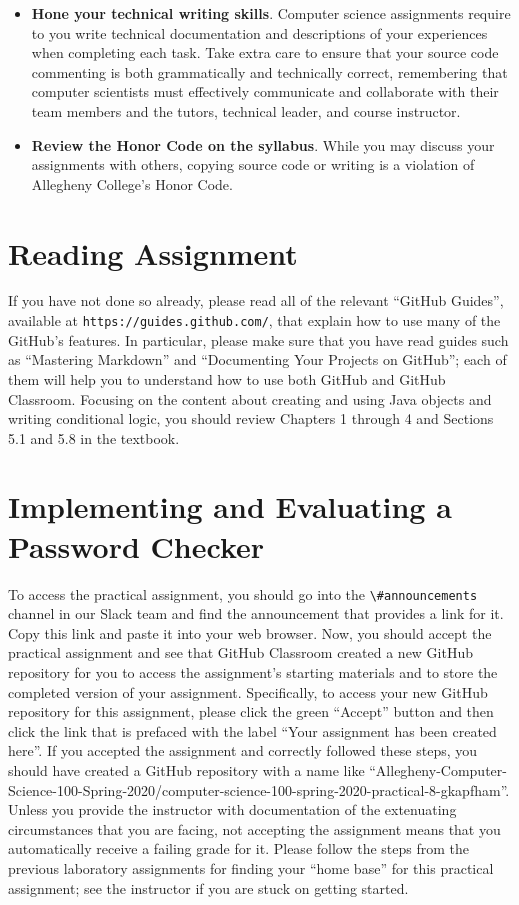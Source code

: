 \documentclass[11pt]{article}
\newcommand{\url}[1]{\lstinline{#1}}
\newcommand{\channel}[1]{\lstinline{#1}}
\begin{document}
\begin{itemize}
\item {\bf Hone your technical writing skills}. Computer science assignments
  require to you write technical documentation and descriptions of your
  experiences when completing each task. Take extra care to ensure that your
  source code commenting is both grammatically and technically correct,
  remembering that computer scientists must effectively communicate and
  collaborate with their team members and the tutors, technical leader, and
  course instructor.

\item {\bf Review the Honor Code on the syllabus}. While you may discuss your
  assignments with others, copying source code or writing is a violation of
  Allegheny College's Honor Code.

\end{itemize}

\section*{Reading Assignment}

If you have not done so already, please read all of the relevant ``GitHub
Guides'', available at \url{https://guides.github.com/}, that explain how to use
many of the GitHub's features. In particular, please make sure that you have
read guides such as ``Mastering Markdown'' and ``Documenting Your Projects on
GitHub''; each of them will help you to understand how to use both GitHub and
GitHub Classroom. Focusing on the content about creating and using Java objects
and writing conditional logic, you should review Chapters 1 through 4 and
Sections 5.1 and 5.8 in the textbook.

\section*{Implementing and Evaluating a Password Checker}

To access the practical assignment, you should go into the
\channel{\#announcements} channel in our Slack team and find the announcement
that provides a link for it. Copy this link and paste it into your web browser.
Now, you should accept the practical assignment and see that GitHub Classroom
created a new GitHub repository for you to access the assignment's starting
materials and to store the completed version of your assignment. Specifically,
to access your new GitHub repository for this assignment, please click the green
``Accept'' button and then click the link that is prefaced with the label ``Your
assignment has been created here''. If you accepted the assignment and correctly
followed these steps, you should have created a GitHub repository with a name
like
``Allegheny-Computer-Science-100-Spring-2020/computer-science-100-spring-2020-practical-8-gkapfham''.
Unless you provide the instructor with documentation of the extenuating
circumstances that you are facing, not accepting the assignment means that you
automatically receive a failing grade for it. Please follow the steps from the
previous laboratory assignments for finding your ``home base'' for this
practical assignment; see the instructor if you are stuck on getting started.
\end{document}
